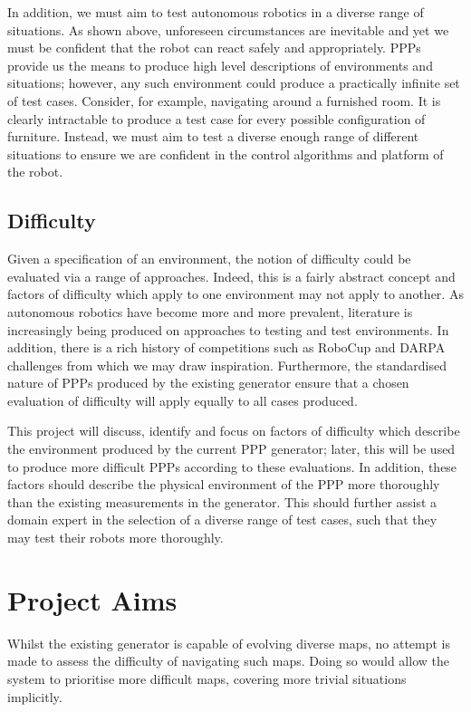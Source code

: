 \documentclass[authoryearcitations]{UoYCSproject}
\begin{document}
In addition, we must aim to test autonomous robotics in a diverse range of situations. As shown above, unforeseen circumstances are inevitable and yet we must be confident that the robot can react safely and appropriately. PPPs provide us the means to produce high level descriptions of environments and situations; however, any such environment could produce a practically infinite set of test cases. Consider, for example, navigating around a furnished room. It is clearly intractable to produce a test case for every possible configuration of furniture. Instead, we must aim to test a diverse enough range of different situations to ensure we are confident in the control algorithms and platform of the robot.

\subsection{Difficulty}
\label{sec:motivation_difficulty}
Given a specification of an environment, the notion of difficulty could be evaluated via a range of approaches. Indeed, this is a fairly abstract concept and factors of difficulty which apply to one environment may not apply to another. As autonomous robotics have become more and more prevalent, literature is increasingly being produced on approaches to testing and test environments. In addition, there is a rich history of competitions such as RoboCup and DARPA challenges from which we may draw inspiration. Furthermore, the standardised nature of PPPs produced by the existing generator ensure that a chosen evaluation of difficulty will apply equally to all cases produced.

This project will discuss, identify and focus on factors of difficulty which describe the environment produced by the current PPP generator; later, this will be used to produce more difficult PPPs according to these evaluations. In addition, these factors should describe the physical environment of the PPP more thoroughly than the existing measurements in the generator. This should further assist a domain expert in the selection of a diverse range of test cases, such that they may test their robots more thoroughly.

\section{Project Aims}
\label{sec:ProjectAims}
Whilst the existing generator is capable of evolving diverse maps, no attempt is made to assess the difficulty of navigating such maps. Doing so would allow the system to prioritise more difficult maps, covering more trivial situations implicitly.
\end{document}
